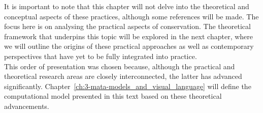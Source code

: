 It is important to note that this chapter will not delve into the theoretical and conceptual aspects of these practices, although some references will be made. The focus here is on analysing the practical aspects of conservation. The theoretical framework that underpins this topic will be explored in the next chapter, where we will outline the origins of these practical approaches as well as contemporary perspectives that have yet to be fully integrated into practice.\\
This order of presentation was chosen because, although the practical and theoretical research areas are closely interconnected, the latter has advanced significantly. Chapter~\ref{ch:3-mata-models_and_visual_language} will define the computational model presented in this text based on these theoretical advancements.

